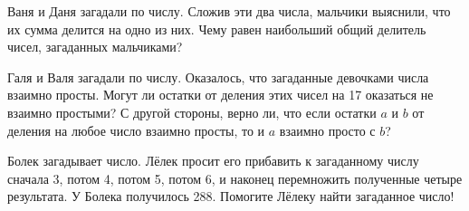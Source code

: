 ﻿
\begin{itemize}

\itA Ваня и Даня загадали по числу. Сложив эти два числа, мальчики выяснили, что их сумма делится на одно из них. Чему равен наибольший общий делитель чисел, загаданных мальчиками?

\itB Галя и Валя загадали по числу. Оказалось, что загаданные девочками числа взаимно просты. Могут ли остатки от деления этих чисел на 17 оказаться не взаимно простыми? С другой стороны, верно ли, что если остатки $a$ и $b$ от деления на любое число взаимно просты, то и $a$ взаимно просто с $b$?

\itC Болек загадывает число. Лёлек просит его прибавить к загаданному числу сначала 3, потом 4, потом 5, потом 6, и наконец перемножить полученные четыре результата. У Болека получилось 288. Помогите Лёлеку найти загаданное число!
\end{itemize}